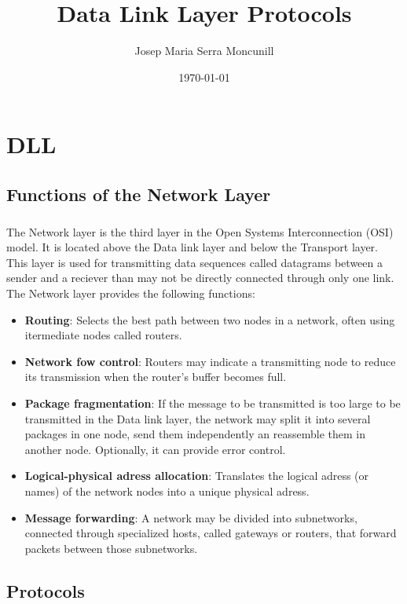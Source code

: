 \documentclass[12pt,a4paper]{report}
\author{Josep Maria Serra Moncunill}
\title{Data Link Layer Protocols}
\date{\today}
\begin{document}
\maketitle
\tableofcontents
\listoffigures
\listoftables

\chapter{DLL}

\section{Functions of the Network Layer}
\paragraph{}The Network layer is the third layer in the Open Systems Interconnection (OSI) model. It is located above the Data link layer and below the Transport layer. This layer is used for transmitting data sequences called datagrams between a sender and a reciever than may not be directly connected through only one link. The Network layer provides the following functions:
\begin{itemize}
	\item \textbf{Routing}: Selects the best path between two nodes in a network, often using itermediate nodes called routers.
	\item \textbf{Network fow control}: Routers may indicate a transmitting node to reduce its transmission when the router's buffer becomes full.
	\item \textbf{Package fragmentation}: If the message to be transmitted is too large to be transmitted in the Data link layer, the network may split it into several packages in one node, send them independently an reassemble them in another node. Optionally, it can provide error control.
	\item \textbf{Logical-physical adress allocation}: Translates the logical adress (or names) of the network nodes into a unique physical adress.
	\item \textbf{Message forwarding}: A network may be divided into subnetworks, connected through specialized hosts, called gateways or routers, that forward packets between those subnetworks.
\end{itemize}

\section{Protocols}
\end{document}
